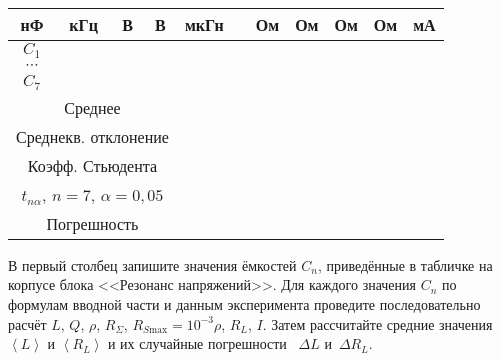 \begin{lab:task}
\begin{tabular}{|c|c|c|c|c|c|c|c|c|c|c|}
		                    нФ & кГц & В & В & мкГн &  & Ом & Ом & Ом & Ом & мА
\\
		                    \hline
		                    $C_1$ & & & & & & & & & & \\
		                    \hline
		                    $\cdots$ &  & & &  &  &  &  & & & \\
		                    \hline
		                    $C_7$& & & & & & & & & & \\
		                    \hline
		                    \multicolumn{4}{|c|}{Среднее} & & & & & & & \\
		                    \hline
		                    \multicolumn{4}{|c|}{Среднекв. отклонение} & & & & & & & \\ \hline
		                    \multicolumn{4}{|c|}{Коэфф. Стьюдента} & & & & & & & \\
		                    \multicolumn{4}{|c|}{$t_{n\alpha}$, $n=7$, $\alpha=0,05$} &
& & & & & & \\ \hline
%
		                    \multicolumn{4}{|c|}{Погрешность} & & & & & & & \\ \hline
		                \end{tabular}


В первый столбец запишите значения ёмкостей $C_n$,
приведённые в табличке на корпусе блока <<Резонанс напряжений>>. Для каждого
значения $C_n$ по формулам вводной части и данным эксперимента проведите
последовательно расчёт $L$, $Q$, $\rho$, $R_{\Sigma}$,
$R_{S\text{max}}=10^{-3}\rho$, $R_L$, $I$. Затем рассчитайте
средние значения $\left< L \right>$ и $\left< R_L \right>$ 
и их случайные погрешности ~$\Delta L$ и~$\Delta R_L$.


\end{lab:task}
